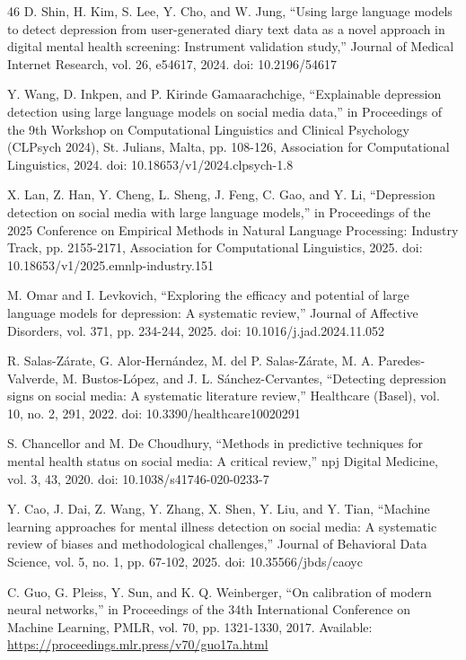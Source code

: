 \documentclass{ieeeaccess}
\begin{document}
\begin{thebibliography}{46}
 D. Shin, H. Kim, S. Lee, Y. Cho, and W. Jung, ``Using large language models to detect depression from user-generated diary text data as a novel approach in digital mental health screening: Instrument validation study,'' Journal of Medical Internet Research, vol. 26, e54617, 2024. doi: 10.2196/54617

 Y. Wang, D. Inkpen, and P. Kirinde Gamaarachchige, ``Explainable depression detection using large language models on social media data,'' in Proceedings of the 9th Workshop on Computational Linguistics and Clinical Psychology (CLPsych 2024), St. Julians, Malta, pp. 108-126, Association for Computational Linguistics, 2024. doi: 10.18653/v1/2024.clpsych-1.8

 X. Lan, Z. Han, Y. Cheng, L. Sheng, J. Feng, C. Gao, and Y. Li, ``Depression detection on social media with large language models,'' in Proceedings of the 2025 Conference on Empirical Methods in Natural Language Processing: Industry Track, pp. 2155-2171, Association for Computational Linguistics, 2025. doi: 10.18653/v1/2025.emnlp-industry.151

 M. Omar and I. Levkovich, ``Exploring the efficacy and potential of large language models for depression: A systematic review,'' Journal of Affective Disorders, vol. 371, pp. 234-244, 2025. doi: 10.1016/j.jad.2024.11.052

 R. Salas-Z\'{a}rate, G. Alor-Hern\'{a}ndez, M. del P. Salas-Z\'{a}rate, M. A. Paredes-Valverde, M. Bustos-L\'{o}pez, and J. L. S\'{a}nchez-Cervantes, ``Detecting depression signs on social media: A systematic literature review,'' Healthcare (Basel), vol. 10, no. 2, 291, 2022. doi: 10.3390/healthcare10020291

 S. Chancellor and M. De Choudhury, ``Methods in predictive techniques for mental health status on social media: A critical review,'' npj Digital Medicine, vol. 3, 43, 2020. doi: 10.1038/s41746-020-0233-7

 Y. Cao, J. Dai, Z. Wang, Y. Zhang, X. Shen, Y. Liu, and Y. Tian, ``Machine learning approaches for mental illness detection on social media: A systematic review of biases and methodological challenges,'' Journal of Behavioral Data Science, vol. 5, no. 1, pp. 67-102, 2025. doi: 10.35566/jbds/caoyc

 C. Guo, G. Pleiss, Y. Sun, and K. Q. Weinberger, ``On calibration of modern neural networks,'' in Proceedings of the 34th International Conference on Machine Learning, PMLR, vol. 70, pp. 1321-1330, 2017. Available: \url{https://proceedings.mlr.press/v70/guo17a.html}


\end{thebibliography}
\end{document}
